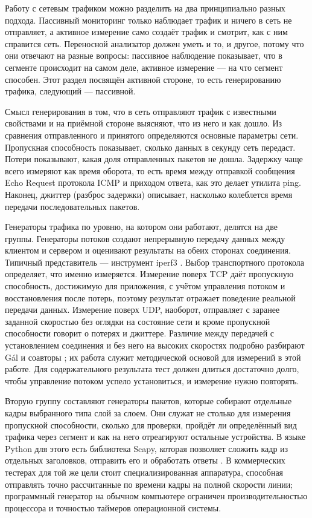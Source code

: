 Работу с сетевым трафиком можно разделить на два принципиально разных подхода. Пассивный мониторинг только наблюдает трафик и ничего в сеть не отправляет, а активное измерение само создаёт трафик и смотрит, как с ним справится сеть. Переносной анализатор должен уметь и то, и другое, потому что они отвечают на разные вопросы: пассивное наблюдение показывает, что в сегменте происходит на самом деле, активное измерение — на что сегмент способен. Этот раздел посвящён активной стороне, то есть генерированию трафика, следующий — пассивной.

Смысл генерирования в том, что в сеть отправляют трафик с известными свойствами и на приёмной стороне выясняют, что из него и как дошло. Из сравнения отправленного и принятого определяются основные параметры сети. Пропускная способность показывает, сколько данных в секунду сеть передаст. Потери показывают, какая доля отправленных пакетов не дошла. Задержку чаще всего измеряют как время оборота, то есть время между отправкой сообщения Echo Request протокола ICMP и приходом ответа, как это делает утилита ping. Наконец, джиттер (разброс задержки) описывает, насколько колеблется время передачи последовательных пакетов.

Генераторы трафика по уровню, на котором они работают, делятся на две группы. Генераторы потоков создают непрерывную передачу данных между клиентом и сервером и оценивают результаты на обеих сторонах соединения. Типичный представитель — инструмент iperf3 \cite{iperf3}. Выбор транспортного протокола определяет, что именно измеряется. Измерение поверх TCP даёт пропускную способность, достижимую для приложения, с учётом управления потоком и восстановления после потерь, поэтому результат отражает поведение реальной передачи данных. Измерение поверх UDP, наоборот, отправляет с заранее заданной скоростью без оглядки на состояние сети и кроме пропускной способности говорит о потерях и джиттере. Различие между передачей с установлением соединения и без него на высоких скоростях подробно разбирают Gál и соавторы \cite{gal2021}; их работа служит методической основой для измерений в этой работе. Для содержательного результата тест должен длиться достаточно долго, чтобы управление потоком успело установиться, и измерение нужно повторять.

Вторую группу составляют генераторы пакетов, которые собирают отдельные кадры выбранного типа слой за слоем. Они служат не столько для измерения пропускной способности, сколько для проверки, пройдёт ли определённый вид трафика через сегмент и как на него отреагируют остальные устройства. В языке Python для этого есть библиотека Scapy, которая позволяет сложить кадр из отдельных заголовков, отправить его и обработать ответы \cite{carter2024}. В коммерческих тестерах для той же цели стоит специализированная аппаратура, способная отправлять точно рассчитанные по времени кадры на полной скорости линии; программный генератор на обычном компьютере ограничен производительностью процессора и точностью таймеров операционной системы.

